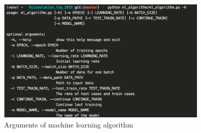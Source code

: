 \begin{figure}[h]
    \centering
    \includegraphics[width=0.9\textwidth]{img/mlalgorithm.png}
    \caption{Arguments of machine learning algorithm}
    \label{fig:argmlal}
\end{figure}


